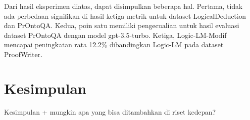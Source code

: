 \documentclass{easychair}
\begin{document}
Dari hasil eksperimen diatas, dapat disimpulkan beberapa hal. Pertama, tidak ada perbedaan signifikan di hasil ketiga metrik untuk dataset LogicalDeduction dan PrOntoQA. Kedua, poin satu memiliki pengecualian untuk hasil evaluasi dataset PrOntoQA dengan model gpt-3.5-turbo. Ketiga, Logic-LM-Modif mencapai peningkatan rata 12.2\% dibandingkan Logic-LM pada dataset ProofWriter.



\section{Kesimpulan}

Kesimpulan + mungkin apa yang bisa ditambahkan di riset kedepan?



\label{sect:bib}

%
%
%



\end{document}
